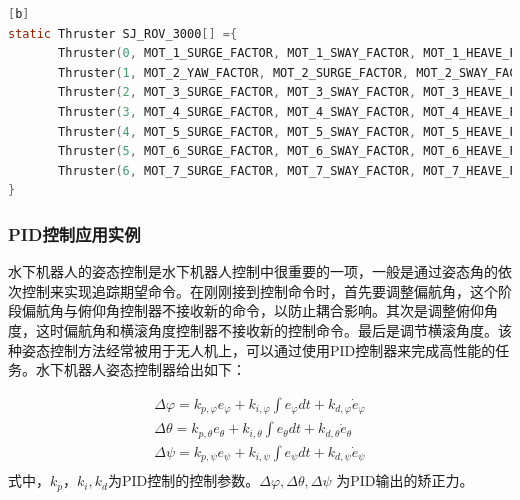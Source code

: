 \begin{lstlisting}[language={C}, caption={ROV的推力布置示例\label{thrustercode:chap2}}][b]
static Thruster SJ_ROV_3000[] ={
       Thruster(0, MOT_1_SURGE_FACTOR, MOT_1_SWAY_FACTOR, MOT_1_HEAVE_FACTOR, MOT_1_ROLL_FACTOR, MOT_1_PITCH_FACTOR, MOT_1_YAW_FACTOR),
       Thruster(1, MOT_2_YAW_FACTOR, MOT_2_SURGE_FACTOR, MOT_2_SWAY_FACTOR, MOT_2_HEAVE_FACTOR, MOT_2_ROLL_FACTOR, MOT_2_PITCH_FACTOR),
       Thruster(2, MOT_3_SURGE_FACTOR, MOT_3_SWAY_FACTOR, MOT_3_HEAVE_FACTOR, MOT_3_ROLL_FACTOR, MOT_3_PITCH_FACTOR, MOT_3_YAW_FACTOR),
       Thruster(3, MOT_4_SURGE_FACTOR, MOT_4_SWAY_FACTOR, MOT_4_HEAVE_FACTOR, MOT_4_ROLL_FACTOR, MOT_4_PITCH_FACTOR, MOT_4_YAW_FACTOR),
       Thruster(4, MOT_5_SURGE_FACTOR, MOT_5_SWAY_FACTOR, MOT_5_HEAVE_FACTOR, MOT_5_ROLL_FACTOR, MOT_5_PITCH_FACTOR, MOT_5_YAW_FACTOR),
       Thruster(5, MOT_6_SURGE_FACTOR, MOT_6_SWAY_FACTOR, MOT_6_HEAVE_FACTOR, MOT_6_ROLL_FACTOR, MOT_6_PITCH_FACTOR, MOT_6_YAW_FACTOR),
       Thruster(6, MOT_7_SURGE_FACTOR, MOT_7_SWAY_FACTOR, MOT_7_HEAVE_FACTOR, MOT_7_ROLL_FACTOR, MOT_7_PITCH_FACTOR, MOT_7_YAW_FACTOR)
}
\end{lstlisting}

\subsubsection{PID控制应用实例 }
水下机器人的姿态控制是水下机器人控制中很重要的一项，一般是通过姿态角的依次控制来实现追踪期望命令。在刚刚接到控制命令时，首先要调整偏航角，这个阶段偏航角与俯仰角控制器不接收新的命令，以防止耦合影响。其次是调整俯仰角度，这时偏航角和横滚角度控制器不接收新的控制命令。最后是调节横滚角度。该种姿态控制方法经常被用于无人机上，可以通过使用PID控制器来完成高性能的任务\cite{mellinger2012trajectory}。水下机器人姿态控制器给出如下：

\begin{equation}
\label{eq:11}
\begin{array}{l}
 \Delta \varphi  = {k_{p,\varphi }}{e_\varphi } + {k_{i,\varphi }}\int {{e_\varphi }dt}  + {k_{d,\varphi }}{{\dot e}_\varphi } \\
 \Delta \theta  = {k_{p,\theta }}{e_\theta } + {k_{i,\theta }}\int {{e_\theta }dt}  + {k_{d,\theta }}{{\dot e}_\theta } \\
 \Delta \psi  = {k_{p,\psi }}{e_\psi } + {k_{i,\psi }}\int {{e_\psi }dt}  + {k_{d,\psi }}{{\dot e}_\psi } \\
 \end{array}
\end{equation}
式中，$k_p，k_i, k_d$为PID控制的控制参数。$\Delta \varphi, \Delta \theta, \Delta \psi$ 为PID输出的矫正力。

